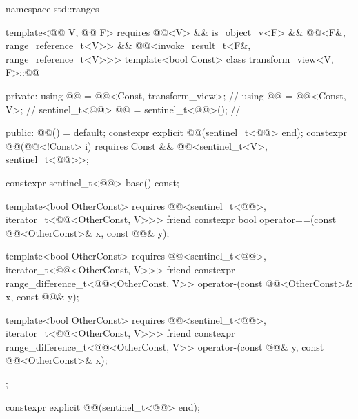 \begin{codeblock}
namespace std::ranges {
  template<@@ V, @@ F>
    requires @@<V> && is_object_v<F> &&
             @@<F&, range_reference_t<V>> &&
             @@<invoke_result_t<F&, range_reference_t<V>>>
  template<bool Const>
  class transform_view<V, F>::@@ {
  private:
    using @@ = @@<Const, transform_view>;  // \expos
    using @@ = @@<Const, V>;                 // \expos
    sentinel_t<@@> @@ = sentinel_t<@@>();         // \expos

  public:
    @@() = default;
    constexpr explicit @@(sentinel_t<@@> end);
    constexpr @@(@@<!Const> i)
      requires Const && @@<sentinel_t<V>, sentinel_t<@@>>;

    constexpr sentinel_t<@@> base() const;

    template<bool OtherConst>
      requires @@<sentinel_t<@@>, iterator_t<@@<OtherConst, V>>>
    friend constexpr bool operator==(const @@<OtherConst>& x, const @@& y);

    template<bool OtherConst>
      requires @@<sentinel_t<@@>, iterator_t<@@<OtherConst, V>>>
    friend constexpr range_difference_t<@@<OtherConst, V>>
      operator-(const @@<OtherConst>& x, const @@& y);

    template<bool OtherConst>
      requires @@<sentinel_t<@@>, iterator_t<@@<OtherConst, V>>>
    friend constexpr range_difference_t<@@<OtherConst, V>>
      operator-(const @@& y, const @@<OtherConst>& x);
  };
}
\end{codeblock}

%
\begin{itemdecl}
constexpr explicit @@(sentinel_t<@@> end);
\end{itemdecl}

